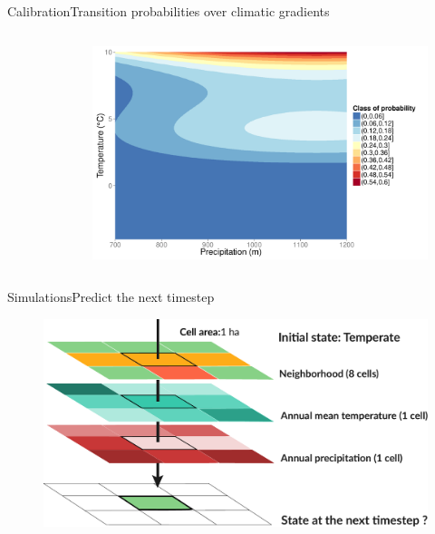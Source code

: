 \documentclass[10pt,aspectratio=149]{beamer}
\begin{document}
\begin{frame}{Calibration}{Transition probabilities over climatic gradients}

	  \begin{columns}[t]
        \begin{column}{0.15\linewidth}
        \vspace{-4em}
        \begin{figure}
			\small{}
		\end{figure}
        \end{column}
		\hspace{1em}
        \begin{column}{0.82\linewidth}
            \begin{figure}
	          \includegraphics[width=1\linewidth]{Figs/betat.pdf}
	        \end{figure}
        \end{column}
      \end{columns}
	
\end{frame}


\begin{frame}{Simulations}{Predict the next timestep}

		\begin{figure}
			\includegraphics[width=1.2\paperheight]{Figs/explicit.pdf}
		\end{figure}
		
	
\end{frame}
\end{document}
